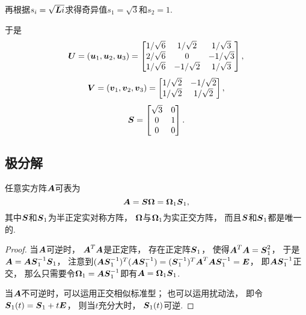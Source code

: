 \begin{example}
\begin{solution}
再根据\(s_i = \sqrt{\boldsymbol{L}{i}}\)求得奇异值\(s_1 = \sqrt{3}\)和\(s_2 = 1\).

于是\[
	\boldsymbol{U} = (\boldsymbol{u}_1,\boldsymbol{u}_2,\boldsymbol{u}_3)
	= \begin{bmatrix}
		1/\sqrt{6} & 1/\sqrt{2} & 1/\sqrt{3} \\
		2/\sqrt{6} & 0 & -1/\sqrt{3} \\
		1/\sqrt{6} & -1/\sqrt{2} & 1/\sqrt{3}
	\end{bmatrix},
\]\[
	\boldsymbol{V} = (\boldsymbol{v}_1,\boldsymbol{v}_2,\boldsymbol{v}_3)
	= \begin{bmatrix}
		1/\sqrt{2} & -1/\sqrt{2} \\
		1/\sqrt{2} & 1/\sqrt{2}
	\end{bmatrix},
\]\[
	\S = \begin{bmatrix}
		\sqrt{3} & 0 \\
		0 & 1 \\
		0 & 0
	\end{bmatrix}.
\]
\end{solution}
\end{example}

\subsection{极分解}
\begin{theorem}
\def\S{\vb{S}}
\def\M{\vb{\Omega}}
任意实方阵\(\boldsymbol{A}\)可表为\[
	\A = \S\M = \M_1 \S_1,
\]
其中\(\S\)和\(\S_1\)为半正定实对称方阵，
\(\M\)与\(\M_1\)为实正交方阵，
而且\(\S\)和\(\S_1\)都是唯一的.
\begin{proof}
当\(\boldsymbol{A}\)可逆时，
\(\boldsymbol{A}^T \boldsymbol{A}\)是正定阵，
存在正定阵\(\S_1\)，
使得\(\A^T \A = \S_1^2\)，
于是\(\A = \A \S_1^{-1} \S_1\)，
注意到\((\A \S_1^{-1})^T (\A \S_1^{-1}) = (\S_1^{-1})^T \A^T \A \S_1^{-1} = \E\)，
即\(\A \S_1^{-1}\)正交，
那么只需要令\(\M_1 = \A \S_1^{-1}\)即有\(\A = \M_1 \S_1\).

当\(\boldsymbol{A}\)不可逆时，可以运用正交相似标准型；
也可以运用扰动法，
即令\(\S_1(t) = \S_1 + t\E\)，
则当\(t\)充分大时，
\(\S_1(t)\)可逆.
\end{proof}
\end{theorem}
